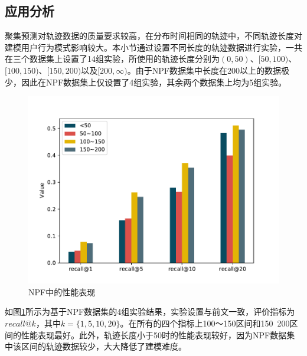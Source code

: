 \documentclass[master]{thesis-uestc}
\begin{document}
\subsection{应用分析}
聚集预测对轨迹数据的质量要求较高，在分布时间相同的轨迹中，不同轨迹长度对建模用户行为模式影响较大。本小节通过设置不同长度的轨迹数据进行实验，一共在三个数据集上设置了14组实验，所使用的轨迹长度分别为$(0,50)$、$[50,100)$、$[100,150)$、$[150,200)$以及$[200,\infty)$。由于NPF数据集中长度在200以上的数据极少，因此在NPF数据集上仅设置了4组实验，其余两个数据集上均为5组实验。
\begin{figure}[!ht]
\centering
\includegraphics[scale=0.41]{./pic/figure-4-c.pdf}
\caption{NPF中的性能表现}
\label{Figure.4.2.5}
\end{figure}
如图\ref{Figure.4.2.5}所示为基于NPF数据集的4组实验结果，实验设置与前文一致，评价指标为$recall@k$，其中$k=\{1,5,10,20\}$。在所有的四个指标上100～150区间和150~200区间的性能表现最好。此外，轨迹长度小于50时的性能表现较好，因为NPF数据集中该区间的轨迹数据较少，大大降低了建模难度。
\end{document}
